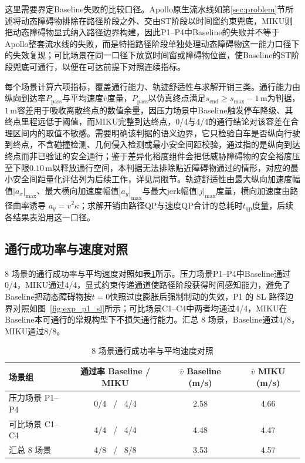 \documentclass[a4paper,zihao=5]{ctexart}
\theoremstyle{definition}
\begin{document}
这里需要界定Baseline失败的比较口径。Apollo原生流水线如第\ref{sec:problem}节所述将动态障碍物排除在路径阶段之外、交由ST阶段以时间窗约束兜底，MIKU则把动态障碍物显式纳入路径边界构建，因此P1--P4中Baseline的失败并不等于Apollo整套流水线的失败，而是特指路径阶段单独处理动态障碍物这一能力口径下的失效复现；可比场景在同一口径下放宽时间窗或障碍物位置，使Baseline的ST阶段兜底可通行，以便在可达前提下对照连续指标。

每个场景计算六项指标，覆盖通行能力、轨迹舒适性与求解开销三类。通行能力由纵向到达率$P_{\mathrm{pass}}$与平均速度$\bar v$度量，$P_{\mathrm{pass}}$以仿真终点满足$s_{\mathrm{end}} \geq s_{\max} - 1$\,m为判据，$1$\,m容差用于吸收离散终点的数值余量，因压力场景中Baseline触发停车降级、其终点里程远低于阈值，而MIKU完整到达终点，0/4与4/4的通行结论对该容差在合理区间内的取值不敏感。需要明确该判据的语义边界，它只检验自车是否纵向行驶到终点，不含碰撞检测、几何侵入检测或最小安全间距校验，通过指的是纵向到达终点而非已验证的安全通行；鉴于差异化裕度组件会把低威胁障碍物的安全裕度压至下限$0.10$\,m以释放通行空间，本判据无法排除贴近障碍物通过的情形，对应的最小安全间距量化评估列为后续工作，详见局限节。轨迹舒适性由最大纵向加速度幅值$|a_x|_{\max}$、最大横向加速度幅值$|a_y|_{\max}$与最大jerk幅值$|j|_{\max}$度量，横向加速度由路径曲率诱导 $a_y = v^2 \kappa$；求解开销由路径QP与速度QP合计的总耗时$t_{\mathrm{qp}}$度量，后续各结果表沿用这一口径。

\subsection{通行成功率与速度对照}
\label{subsec:exp_passrate}

8 场景的通行成功率与平均速度对照如表\ref{tab:exp_pass}所示。压力场景P1--P4中Baseline通过0/4，MIKU通过4/4，显式约束传递通道使路径阶段获得时间感知能力，避免了Baseline把动态障碍物按$t=0$快照过度膨胀后强制制动的失效，P1 的 SL 路径边界对照如图~\ref{fig:exp_p1_sl}所示；可比场景C1--C4中两者均通过4/4，MIKU在Baseline本可通行的常规构型下不损失通行能力。汇总 8 场景，Baseline通过4/8，MIKU通过8/8。

\begin{table}[htbp]
\centering
\caption{8 场景通行成功率与平均速度对照}
\label{tab:exp_pass}
\small
\begin{tabular}{lccc}
\toprule
\textbf{场景组} & \textbf{通过率 Baseline / MIKU} & \textbf{$\bar v$ Baseline (m/s)} & \textbf{$\bar v$ MIKU (m/s)} \\
\midrule
压力场景 P1--P4 & 0/4 \ / \ 4/4 & 2.58 & 4.66 \\
可比场景 C1--C4 & 4/4 \ / \ 4/4 & 4.48 & 4.47 \\
\midrule
汇总 8 场景 & 4/8 \ / \ 8/8 & 3.53 & 4.57 \\
\bottomrule
\end{tabular}
\end{table}
\end{document}
